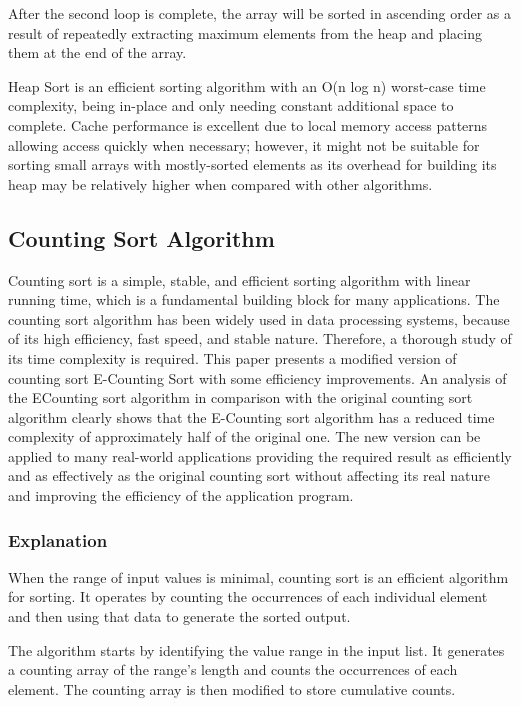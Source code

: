\documentclass{article}
\begin{document}
After the second loop is complete, the array will be sorted in ascending order as a result of repeatedly extracting maximum elements from the heap and placing them at the end of the array.

Heap Sort is an efficient sorting algorithm with an O(n log n) worst-case time complexity, being in-place and only needing constant additional space to complete. Cache performance is excellent due to local memory access patterns allowing access quickly when necessary; however, it might not be suitable for sorting small arrays with mostly-sorted elements as its overhead for building its heap may be relatively higher when compared with other algorithms.

\subsection{Counting Sort Algorithm}
Counting sort is a simple, stable, and efficient sorting
algorithm with linear running time, which is a fundamental
building block for many applications. The counting sort algorithm
has been widely used in data processing systems, because of
its high efficiency, fast speed, and stable nature. Therefore, a
thorough study of its time complexity is required. This paper
presents a modified version of counting sort E-Counting Sort
with some efficiency improvements. An analysis of the ECounting sort algorithm in comparison with the original counting
sort algorithm clearly shows that the E-Counting sort algorithm
has a reduced time complexity of approximately half of the
original one. The new version can be applied to many real-world applications providing the required result as efficiently
and as effectively as the original counting sort without affecting its
real nature and improving the efficiency of the application program.\cite{bajpai2014implementing}
\subsubsection{Explanation}

When the range of input values is minimal, counting sort is an efficient algorithm for sorting. It operates by counting the occurrences of each individual element and then using that data to generate the sorted output. 

The algorithm starts by identifying the value range in the input list. It generates a counting array of the range's length and counts the occurrences of each element. The counting array is then modified to store cumulative counts.
\end{document}
